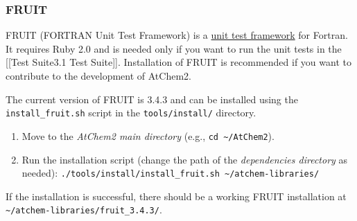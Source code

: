 \hypertarget{fruit}{%
\subsubsection{FRUIT}\label{fruit}}

FRUIT (FORTRAN Unit Test Framework) is a
\href{https://en.wikipedia.org/wiki/Unit_testing}{unit test framework}
for Fortran. It requires Ruby 2.0 and is needed only if you want to run
the unit tests in the {[}{[}Test Suite\textbar{}3.1 Test Suite{]}{]}.
Installation of FRUIT is recommended if you want to contribute to the
development of AtChem2.

The current version of FRUIT is 3.4.3 and can be installed using the
\texttt{install\_fruit.sh} script in the \texttt{tools/install/}
directory.

\begin{enumerate}
\def\labelenumi{\arabic{enumi}.}
\item
  Move to the \emph{AtChem2 main directory} (e.g.,
  \texttt{cd\ \textasciitilde{}/AtChem2}).
\item
  Run the installation script (change the path of the \emph{dependencies
  directory} as needed):
  \texttt{./tools/install/install\_fruit.sh\ \textasciitilde{}/atchem-libraries/}
\end{enumerate}

If the installation is successful, there should be a working FRUIT
installation at
\texttt{\textasciitilde{}/atchem-libraries/fruit\_3.4.3/}.
